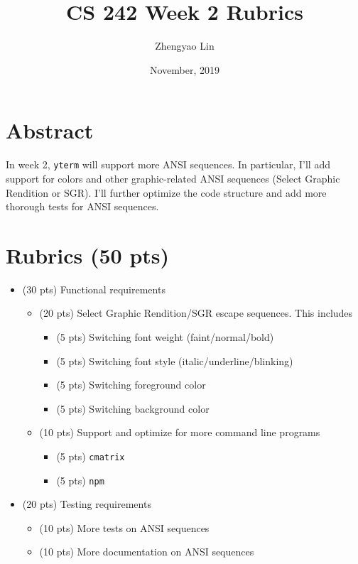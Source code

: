 \documentclass[11pt]{article}
\begin{document}
    \title{CS 242 Week 2 Rubrics}
    \author{Zhengyao Lin}
    \date{November, 2019}
    \maketitle
    
    \section{Abstract}
        In week 2, \texttt{yterm} will support more ANSI sequences. In particular, I'll add support for colors and other graphic-related ANSI sequences (Select Graphic Rendition or SGR). I'll further optimize the code structure and add more thorough tests for ANSI sequences.
    
    \section{Rubrics (50 pts)}
        \begin{itemize}
            \item (30 pts) Functional requirements
            \begin{itemize}
                \item (20 pts) Select Graphic Rendition/SGR escape sequences. This includes
                \begin{itemize}
                    \item (5 pts) Switching font weight (faint/normal/bold)
                    \item (5 pts) Switching font style (italic/underline/blinking)
                    \item (5 pts) Switching foreground color
                    \item (5 pts) Switching background color
                \end{itemize}
            
                \item (10 pts) Support and optimize for more command line programs
                \begin{itemize}
                    \item (5 pts) \texttt{cmatrix}
                    \item (5 pts) \texttt{npm}
                \end{itemize}
            \end{itemize}
        
            \item (20 pts) Testing requirements
            \begin{itemize}
                \item (10 pts) More tests on ANSI sequences
                \item (10 pts) More documentation on ANSI sequences
            \end{itemize}
        \end{itemize}
\end{document}
